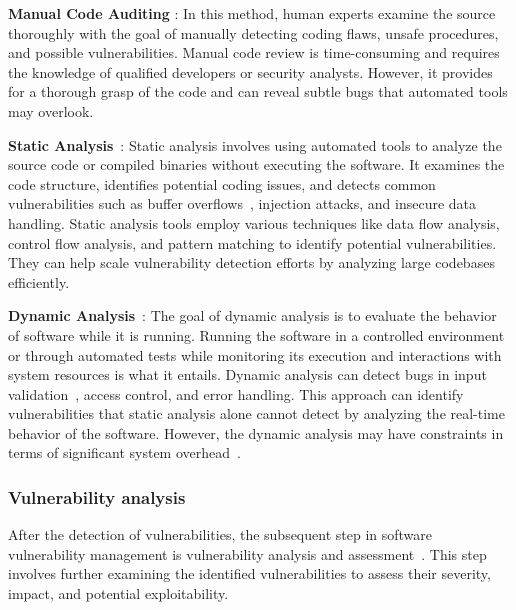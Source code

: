 \noindent \textbf{Manual Code Auditing} \cite{staron2020using, bacchelli2013expectations, carlsson2005software, shar2012auditing, shar2010auditing}: In this method, human experts examine the source thoroughly with the goal of manually detecting coding flaws, unsafe procedures, and possible vulnerabilities. Manual code review is time-consuming and requires the knowledge of qualified developers or security analysts. However, it provides for a thorough grasp of the code and can reveal subtle bugs that automated tools may overlook.

\noindent \textbf{Static Analysis}~\cite{infer, flawfinder, rats, cppcheck, SpotBugs, lattner2008llvm}: Static analysis involves using automated tools to analyze the source code or compiled binaries without executing the software. It examines the code structure, identifies potential coding issues, and detects common vulnerabilities such as buffer overflows~\cite{harzevili2022characterizing}, injection attacks, and insecure data handling. Static analysis tools employ various techniques like data flow analysis, control flow analysis, and pattern matching to identify potential vulnerabilities. They can help scale vulnerability detection efforts by analyzing large codebases efficiently.

\noindent \textbf{Dynamic Analysis}~\cite{nethercote2007valgrind, lehmann2019wasabi, cadar2008klee}: The goal of dynamic analysis is to evaluate the behavior of software while it is running. Running the software in a controlled environment or through automated tests while monitoring its execution and interactions with system resources is what it entails. Dynamic analysis can detect bugs in input validation~\cite{ kim2019rvfuzzer}, access control, and error handling. This approach can identify vulnerabilities that static analysis alone cannot detect by analyzing the real-time behavior of the software. However, the dynamic analysis may have constraints in terms of significant system overhead~\cite{yong2005using}.

\subsubsection{Vulnerability analysis}
After the detection of vulnerabilities, the subsequent step in software vulnerability management is vulnerability analysis and assessment~\cite{le2019automated, suciu2022expected, jacobs2023enhancing, yin2022real, le2022survey, mahor2022mobile, frei2006large}. This step involves further examining the identified vulnerabilities to assess their severity, impact, and potential exploitability.

